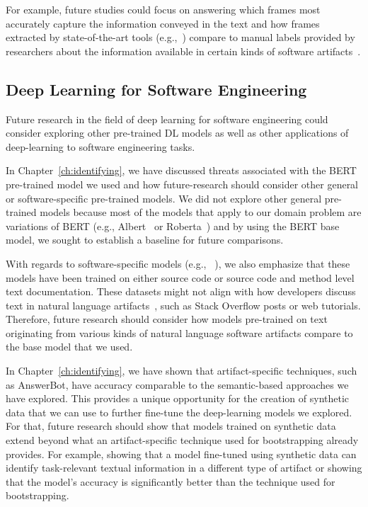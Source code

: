 For example, future studies could focus on answering 
which frames most accurately capture the information conveyed in the text 
and how frames extracted by state-of-the-art tools (e.g.,~\cite{swayamdipta17, chen2021joint})
compare to manual labels provided by researchers 
about the information available in certain kinds of software artifacts~\cite{Maalej2013, Arya2019, Sorbo2015}.  



 






\subsection{Deep Learning for Software Engineering}
\label{cp7:deep-learning}



Future research in the field of deep learning for software engineering could consider 
exploring other pre-trained \acs{DL} models as well as other applications of 
deep-learning to software engineering tasks. 




In Chapter~\ref{ch:identifying}, we have discussed threats associated with the BERT pre-trained model 
we used and how future-research should consider other 
general or software-specific pre-trained models.
We did not explore other general pre-trained models because most of the models that apply to our domain problem 
are variations of BERT (e.g., Albert~\cite{lan2019albert} or Roberta~\cite{liu2019roberta})
and by using the BERT base model, we sought to establish a baseline for future comparisons.




With regards to software-specific models (e.g., ~\cite{feng2020-codebert, li2019neural}), we also emphasize 
that these models have been trained on either source code or source code and method level text documentation. 
These datasets might not align with how developers discuss text in natural language artifacts~\cite{arya2020}, such 
as Stack Overflow posts or web tutorials. Therefore, future research should consider how 
 models pre-trained on text originating from various kinds of 
natural language software artifacts compare to the base model that we used.





In Chapter~\ref{ch:identifying}, we have shown that artifact-specific techniques, such as AnswerBot, have accuracy comparable to the semantic-based approaches
we have explored. This  provides
a unique opportunity for the creation of synthetic data that we can use to further fine-tune the deep-learning models we explored.
For that, future research should show that models trained on synthetic data
 extend beyond what an artifact-specific technique used for bootstrapping already provides. For example, showing that
a model fine-tuned using synthetic data can identify task-relevant textual information in a different type of artifact or showing
that the model's accuracy is significantly better than the technique used for bootstrapping.


